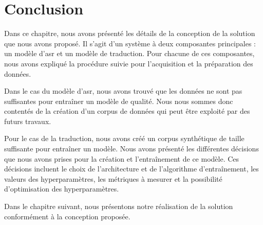 \section{Conclusion}

Dans ce chapitre, nous avons présenté les détails de la conception de la solution que nous avons proposé.
Il s'agit d'un système à deux composantes principales : 
un modèle d'\gls{asr} et un modèle de traduction.
Pour chacune de ces composantes, nous avons expliqué la procédure suivie 
pour l'acquisition et la préparation des données.

Dans le cas du modèle d'\gls{asr}, nous avons trouvé que les données ne sont pas suffisantes 
pour entraîner un modèle de qualité.
Nous nous sommes donc contentés de la création d'un corpus de données qui peut être exploité par des futurs travaux.

Pour le cas de la traduction, nous avons créé un corpus synthétique de taille suffisante pour entraîner un modèle.
Nous avons présenté les différentes décisions que nous avons prises pour la création et l'entraînement de ce modèle.
Ces décisions incluent le choix de l'architecture et de l'algorithme d'entraînement, 
les valeurs des hyperparamètres, les métriques à mesurer et la possibilité d'optimisation des hyperparamètres.

Dans le chapitre suivant, nous présentons notre réalisation de la solution conformément à la conception proposée.


